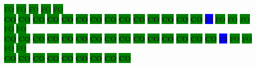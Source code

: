 \colorbox{green}{\color[gray]{0.75}FO}%
\colorbox{green}{\color[gray]{0.75}FO}%
\colorbox{green}{\color[gray]{0.75}FO}%
\colorbox{green}{\color[gray]{0.75}FO}%
\colorbox{green}{\color[gray]{0.75}FO}%
\\
\colorbox{green}{\color[rgb]{0,0,0}\textbf{CO}}%
\colorbox{green}{\color[rgb]{0,0,0}\textbf{CO}}%
\colorbox{green}{\color[rgb]{0,0,0}\textbf{CO}}%
\colorbox{green}{\color[rgb]{0,0,0}\textbf{CO}}%
\colorbox{green}{\color[rgb]{0,0,0}\textbf{CO}}%
\colorbox{green}{\color[rgb]{0,0,0}\textbf{CO}}%
\colorbox{green}{\color[rgb]{0,0,0}\textbf{CO}}%
\colorbox{green}{\color[rgb]{0,0,0}\textbf{CO}}%
\colorbox{green}{\color[rgb]{0,0,0}\textbf{CO}}%
\colorbox{green}{\color[rgb]{0,0,0}\textbf{CO}}%
\colorbox{green}{\color[rgb]{0,0,0}\textbf{CO}}%
\colorbox{green}{\color[rgb]{0,0,0}\textbf{CO}}%
\colorbox{green}{\color[rgb]{0,0,0}\textbf{CO}}%
\colorbox{green}{\color[rgb]{0,0,0}\textbf{CO}}%
\colorbox{blue}{\color[rgb]{1,0,0}\textbf{10}}%
\colorbox{green}{\color[gray]{0.75}FO}%
\colorbox{green}{\color[gray]{0.75}FO}%
\colorbox{green}{\color[gray]{0.75}FO}%
\colorbox{green}{\color[gray]{0.75}FO}%
\colorbox{green}{\color[gray]{0.75}FO}%
\\
\colorbox{green}{\color[rgb]{0,0,0}\textbf{CO}}%
\colorbox{green}{\color[rgb]{0,0,0}\textbf{CO}}%
\colorbox{green}{\color[rgb]{0,0,0}\textbf{CO}}%
\colorbox{green}{\color[rgb]{0,0,0}\textbf{CO}}%
\colorbox{green}{\color[rgb]{0,0,0}\textbf{CO}}%
\colorbox{green}{\color[rgb]{0,0,0}\textbf{CO}}%
\colorbox{green}{\color[rgb]{0,0,0}\textbf{CO}}%
\colorbox{green}{\color[rgb]{0,0,0}\textbf{CO}}%
\colorbox{green}{\color[rgb]{0,0,0}\textbf{CO}}%
\colorbox{green}{\color[rgb]{0,0,0}\textbf{CO}}%
\colorbox{green}{\color[rgb]{0,0,0}\textbf{CO}}%
\colorbox{green}{\color[rgb]{0,0,0}\textbf{CO}}%
\colorbox{green}{\color[rgb]{0,0,0}\textbf{CO}}%
\colorbox{green}{\color[rgb]{0,0,0}\textbf{CO}}%
\colorbox{green}{\color[rgb]{0,0,0}\textbf{CO}}%
\colorbox{blue}{\color[rgb]{1,0,0}\textbf{12}}%
\colorbox{green}{\color[gray]{0.75}FO}%
\colorbox{green}{\color[gray]{0.75}FO}%
\colorbox{green}{\color[gray]{0.75}FO}%
\colorbox{green}{\color[gray]{0.75}FO}%
\\
\colorbox{green}{\color[rgb]{0,0,0}\textbf{CO}}%
\colorbox{green}{\color[rgb]{0,0,0}\textbf{CO}}%
\colorbox{green}{\color[rgb]{0,0,0}\textbf{CO}}%
\colorbox{green}{\color[rgb]{0,0,0}\textbf{CO}}%
\colorbox{green}{\color[rgb]{0,0,0}\textbf{CO}}%
\colorbox{green}{\color[rgb]{0,0,0}\textbf{CO}}%
\colorbox{green}{\color[rgb]{0,0,0}\textbf{CO}}%
\colorbox{green}{\color[rgb]{0,0,0}\textbf{CO}}%
\colorbox{green}{\color[rgb]{0,0,0}\textbf{CO}}%
